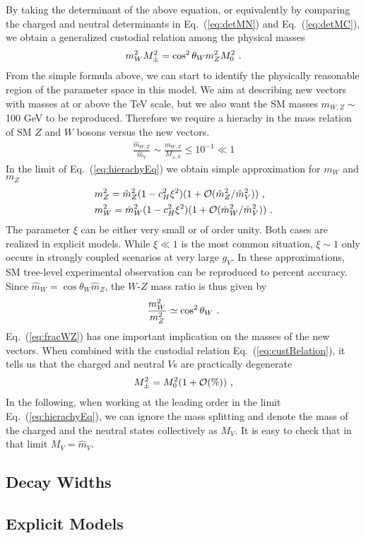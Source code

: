 By taking the determinant of the above equation, or equivalently by comparing the charged and neutral determinants in Eq.~(\ref{eq:detMN}) and Eq.~(\ref{eq:detMC}), we obtain a generalized custodial relation among the physical masses
\begin{align}
  \label{eq:custRelation}
m_{W}^{2}M_{\pm}^{2}=\cos^{2}\theta_{W}m_{Z}^{2}M_{0}^{2}\textup{ .}
\end{align}
From the simple formula above, we can start to identify the physically reasonable region of the parameter space in this model. We aim at describing new vectors with masses at or above the TeV scale, but we also want the SM masses $m_{W,Z} \sim$ 100 GeV to be reproduced. Therefore we require a hierachy in the mass relation of SM $Z$ and $W$ bosons versus the new vectors.
\begin{align}
  \label{eq:hierachyEq}
  \frac{\hat{m}_{W,Z}}{\hat{m}_{V}}\sim \frac{m_{W,Z}}{M_{\pm ,0}}\leq10^{-1}\ll1
\end{align}
In the limit of Eq.~(\ref{eq:hierachyEq}) we obtain simple approximation for $m_{W}$ and $m_{Z}$
\begin{align}
  &m_{Z}^{2}=\hat{m}_{Z}^{2}(1-c_{H}^{2}\xi^{2})(1+\mathcal{O}(\hat{m}_{Z}^{2}/\hat{m}_{V}^{2}))\textup{ ,}\nonumber\\
  &m_{W}^{2}=\hat{m}_{W}^{2}(1-c_{H}^{2}\xi^{2})(1+\mathcal{O}(\hat{m}_{W}^{2}/\hat{m}_{V}^{2}))\textup{ .}
\end{align}
The parameter $\xi$ can be either very small or of order unity. Both cases are realized in explicit models. While $\xi\ll1$ is the most common situation, $\xi\sim1$ only occurs in strongly coupled scenarios at very large $g_{V}$. In these approximations, SM tree-level experimental observation can be reproduced to percent accuracy.
\newline Since $\hat{m}_{W}=\cos\theta_{W}\hat{m}_{Z}$, the $W$-$Z$ mass ratio is thus given by
\begin{align}
  \label{eq:fracWZ}
  \frac{m_{W}^{2}}{m_{Z}^{2}}\simeq \cos^{2}{\theta_{W}}\textup{ .}
\end{align}
Eq.~(\ref{eq:fracWZ}) has one important implication on the masses of the new vectors. When combined with the custodial relation Eq.~(\ref{eq:custRelation}), it tells us that the charged and neutral $V$s are practically degenerate
\begin{align}
  M_{\pm}^{2}=M_{0}^{2}(1+\mathcal{O}(\%))\textup{ ,}
\end{align}
In the following, when working at the leading order in the limit Eq.~(\ref{eq:hierachyEq}), we can ignore the mass splitting and denote the mass of the charged and the neutral states collectively as $M_{V}$. It is easy to check that in that limit $M_{V}=\hat{m}_{V}$.



\subsection*{Decay Widths}
\subsection{Explicit Models}
